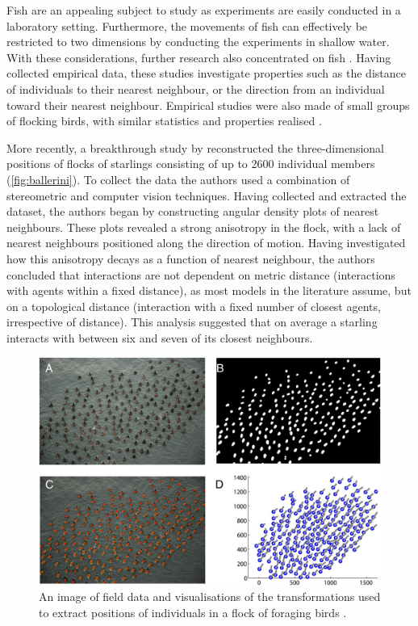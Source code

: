 Fish are an appealing subject to study as experiments are easily conducted in a
laboratory setting. Furthermore, the movements of fish can effectively be
restricted to two dimensions by conducting the experiments in shallow water.
With these considerations, further research also concentrated on fish
\parencite{partridge80,van_long85}. Having collected empirical data, these
studies investigate properties such as the distance of individuals to their
nearest neighbour, or the direction from an individual toward their nearest
neighbour. Empirical studies were also made of small groups of flocking birds,
with similar statistics and properties realised \parencite{major78,budgey98}.

More recently, a breakthrough study by \textcite{ballerini08} reconstructed the
three-dimensional positions of flocks of starlings consisting of up to 2600
individual members (\cref{fig:ballerini}). To collect the data the authors
used a combination of stereometric and computer vision techniques. Having
collected and extracted the dataset, the authors began by constructing angular
density plots of nearest neighbours. These plots revealed a strong anisotropy
in the flock, with a lack of nearest neighbours positioned along the direction
of motion. Having investigated how this anisotropy decays as a function of
nearest neighbour, the authors concluded that interactions are not dependent on
metric distance (interactions with agents within a fixed distance), as most
models in the literature assume, but on a topological distance (interaction
with a fixed number of closest agents, irrespective of distance). This analysis
suggested that on average a starling interacts with between six and seven of
its closest neighbours.

\begin{figure}[tb]
	\includegraphics[width=\textwidth]{lukeman_data.jpg}
    \caption{An image of field data and visualisations of the transformations
        used to extract positions of individuals in a flock of foraging birds
        \parencite{lukeman10}.}
	\label{fig:lukeman_extraction}
\end{figure}

